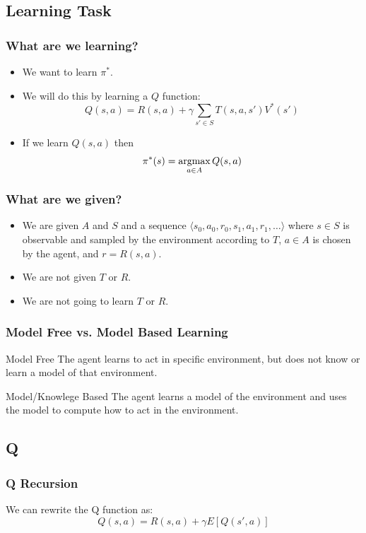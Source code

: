 \documentclass[ignorenonframetext]{beamer}
\newcommand{\argmax}{\operatornamewithlimits{argmax}}
\begin{document}
\subsection{Learning Task}
\begin{frame}
	\frametitle{What are we learning?}
	\begin{itemize}
		\item We want to learn $\pi^*$.
			\pause
		\item We will do this by learning a $Q$ function:
			\[
			Q(s,a) = R(s,a) + \gamma \sum_{s' \in S}T(s,a, s') V^*(s')
			\]
			\pause
		\item If we learn $Q(s,a)$ then 
			\[
			\pi^*(s) = \argmax_{a\in A} Q(s,a)
			\]
	\end{itemize}
\end{frame}

\begin{frame}
	\frametitle{What are we given?}
	\begin{itemize}
		\item We are given $A$ and $S$ and a sequence 
			$\langle s_0,a_0,r_0,s_1,a_1,r_1,\dots \rangle$
			where $s \in S$ is observable and sampled by the environment
			according to $T$, $a\in A$ is chosen by the agent, and $r =
			R(s,a)$.
			\pause
		\item We are not given $T$ or $R$.
			\pause
		\item We are not going to learn $T$ or $R$.
	\end{itemize}
\end{frame}

\begin{frame}
	\frametitle{Model Free vs. Model Based Learning}
	\begin{block}{Model Free}
		The agent learns to act in specific environment, but does not
		know or learn a model of that environment.
	\end{block}
	\begin{block}{Model/Knowlege Based}
		The agent learns a model of the environment and uses the model to
		compute how to act in the environment.
	\end{block}
\end{frame}

\subsection{Q}
\begin{frame}
	\frametitle{Q Recursion}
	We can rewrite the Q function as:
	\[
	Q(s,a) = R(s,a) + \gamma E[Q(s',a)]
	\]
\end{frame}
\end{document}
